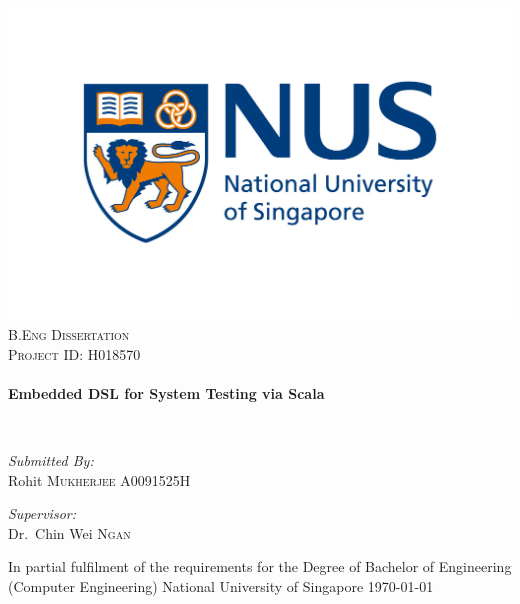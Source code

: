 \begin{titlepage}
\begin{center}

\includegraphics[width=1\textwidth]{figures/nus_logo.jpg}\\[1cm]

\textsc{\Large B.Eng Dissertation}\\[0.3cm]
\textsc{\Large Project ID: H018570}\\[0.3cm]

\HRule \\[0.4cm]
{ \huge \bfseries Embedded DSL for System Testing via Scala \\[0.4cm] }

\HRule \\[1.0cm]

\noindent
\begin{minipage}{0.4\textwidth}
\begin{flushleft} \large
\emph{Submitted By:}\\
Rohit \textsc{Mukherjee}
A0091525H
\end{flushleft}
\end{minipage}%
\begin{minipage}{0.4\textwidth}
\begin{flushright} \large
\emph{Supervisor:} \\
Dr.~Chin Wei \textsc{Ngan}
\end{flushright}
\end{minipage}
\vfill

\vspace{8 mm}
In partial fulfilment of the requirements for the Degree of Bachelor of Engineering (Computer Engineering) National University of Singapore 
\bigskip
{\large \today}

\end{center}
\end{titlepage}